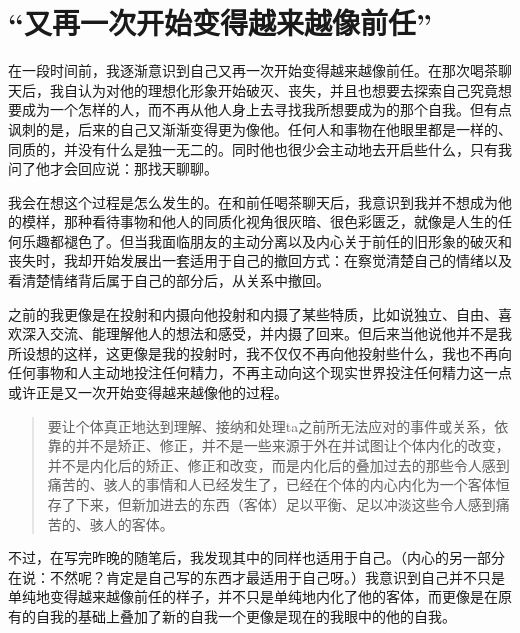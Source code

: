 \chapter{“又再一次开始变得越来越像前任”}








在一段时间前，我逐渐意识到自己又再一次开始变得越来越像前任。在那次喝茶聊天后，我自认为对他的理想化形象开始破灭、丧失，并且也想要去探索自己究竟想要成为一个怎样的人，而不再从他人身上去寻找我所想要成为的那个自我。但有点讽刺的是，后来的自己又渐渐变得更为像他。任何人和事物在他眼里都是一样的、同质的，并没有什么是独一无二的。同时他也很少会主动地去开启些什么，只有我问了他才会回应说：那找天聊聊。

我会在想这个过程是怎么发生的。在和前任喝茶聊天后，我意识到我并不想成为他的模样，那种看待事物和他人的同质化视角很灰暗、很色彩匮乏，就像是人生的任何乐趣都褪色了。但当我面临朋友的主动分离以及内心关于前任的旧形象的破灭和丧失时，我却开始发展出一套适用于自己的撤回方式：在察觉清楚自己的情绪以及看清楚情绪背后属于自己的部分后，从关系中撤回。

之前的我更像是在投射和内摄\pozhehao{}向他投射和内摄了某些特质，比如说独立、自由、喜欢深入交流、能理解他人的想法和感受，并内摄了回来。但后来当他说他并不是我所设想的这样，这更像是我的投射时，我不仅仅不再向他投射些什么，我也不再向任何事物和人主动地投注任何精力，不再主动向这个现实世界投注任何精力\pozhehao{}这一点或许正是又一次开始变得越来越像他的过程。

\blockquote{
	要让个体真正地达到理解、接纳和处理ta之前所无法应对的事件或关系，依靠的并不是矫正、修正，并不是一些来源于外在并试图让个体内化的改变，并不是内化后的矫正、修正和改变，而是内化后的叠加\pozhehao{}过去的那些令人感到痛苦的、骇人的事情和人已经发生了，已经在个体的内心内化为一个客体恒存了下来，但新加进去的东西（客体）足以平衡、足以冲淡这些令人感到痛苦的、骇人的客体。
}

不过，在写完昨晚的随笔后，我发现其中的同样也适用于自己。（内心的另一部分在说：不然呢？肯定是自己写的东西才最适用于自己呀。）我意识到自己并不只是单纯地变得越来越像前任的样子，并不只是单纯地内化了他的客体，而更像是在原有的自我的基础上叠加了新的自我\pozhehao{}一个更像是现在的我眼中的他的自我。


